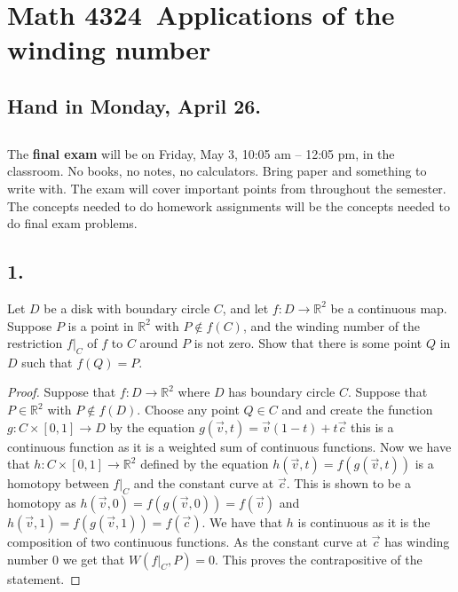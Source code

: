 \documentclass{amsart}
\theoremstyle{plain}
\theoremstyle{definition}
\theoremstyle{remark}
\begin{document}
\section*{Math 4324\  Applications of the winding number} 

\subsection*{Hand in Monday, April 26.} 

\vspace{.25in}
\subsection*{} The {\bf final exam} will be on Friday, May 3, 10:05 am -- 12:05 pm, in the classroom. No books, no notes, no calculators. Bring paper and something to write with. The exam will cover important points from throughout the semester. The concepts needed to do homework assignments will be the concepts needed to do  final exam problems. 

\vspace{.25in}
\noindent
\subsection*{1.} Let $D$ be  a disk with boundary circle $C$, and let $f: D\to \mathbb{R}^2$ be a continuous map. Suppose $P$ is a point in $\mathbb{R}^2$ with $P\not \in f(C)$, and the winding number of the restriction $f|_C$ of $f$ to $C$ around $P$ is not zero. Show that there is some point $Q$ in $D$ such that $f(Q) = P$.

\begin{proof}

    Suppose that $f:D\to \mathbb{R}^2$ where $D$ has boundary circle $C$. Suppose that $P\in \mathbb{R}^2$ with $P\not \in f(D)$. Choose any point $Q\in C$ and and create the function $g:C\times [0,1]\to D$ by the equation $g(\vec v, t)=\vec v(1-t)+t \vec c$ this is a continuous function as it is a weighted sum of continuous functions. Now we have that $h:C\times [0,1]\to \mathbb{R}^2$ defined by the equation $h(\vec v,t)=f(g(\vec v,t))$ is a homotopy between $f|_C$ and the constant curve at $\vec c$. This is shown to be a homotopy as $h(\vec v,0)=f(g(\vec v,0))= f(\vec v)$ and $h(\vec v,1)=f(g(\vec v,1))=f(\vec c)$. We have that $h$ is continuous as it is the composition of two continuous functions. As the constant curve at $\vec c$ has winding number $0$ we get that $W(f|_C,P)=0$. This proves the contrapositive of the statement.
    
\end{proof}
\end{document}

